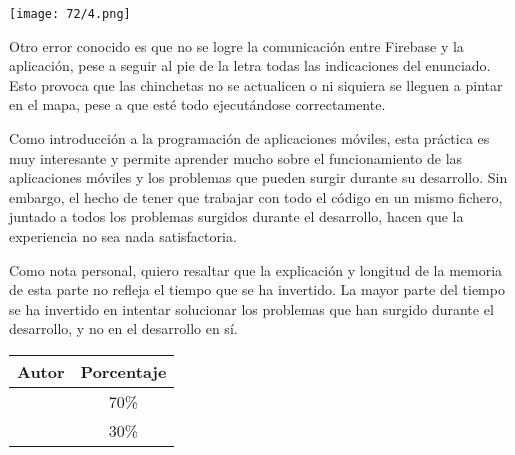 \begin{minipage}{\linewidth}
	\centering
	\texttt{[image: 72/4.png]}
	\label{fig:72/100000}
\end{minipage}

Otro error conocido es que no se logre la comunicación entre Firebase y la aplicación, pese a seguir
al pie de la letra todas las indicaciones del enunciado. Esto provoca que las chinchetas no se
actualicen o ni siquiera se lleguen a pintar en el mapa, pese a que esté todo ejecutándose correctamente.

Como introducción a la programación de aplicaciones móviles, esta práctica es muy interesante y
permite aprender mucho sobre el funcionamiento de las aplicaciones móviles y los problemas que
pueden surgir durante su desarrollo. Sin embargo, el hecho de tener que trabajar con todo el código en
un mismo fichero, juntado a todos los problemas surgidos durante el desarrollo, hacen que la experiencia no sea
nada satisfactoria.

Como nota personal, quiero resaltar que la explicación y longitud de la memoria de esta parte no refleja
el tiempo que se ha invertido. La mayor parte del tiempo se ha invertido en intentar solucionar los
problemas que han surgido durante el desarrollo, y no en el desarrollo en sí.

\begin{center}
	\begin{tabular}{|c|c|}
		\hline
		\textbf{Autor} & \textbf{Porcentaje} \\
		\hline
		\hline
		\authorOne & 70\% \\
		\authorTwo & 30\% \\
		\hline
	\end{tabular}
\end{center}
